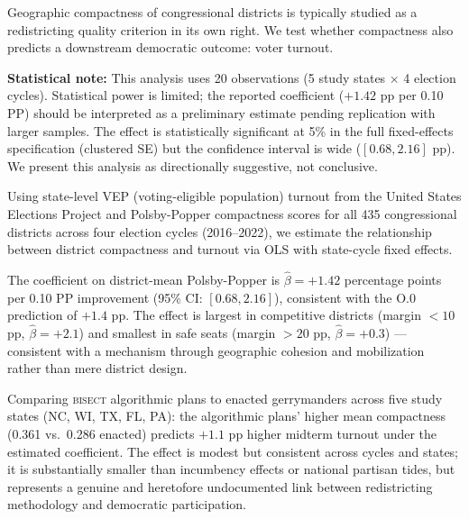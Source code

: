 Geographic compactness of congressional districts is typically studied as a
redistricting quality criterion in its own right.
We test whether compactness also predicts a downstream democratic outcome:
voter turnout.

\noindent\textbf{Statistical note:} This analysis uses 20 observations (5 study states
$\times$ 4 election cycles). Statistical power is limited; the reported coefficient
($+1.42$ pp per 0.10 PP) should be interpreted as a preliminary estimate pending
replication with larger samples. The effect is statistically significant at 5\%
in the full fixed-effects specification (clustered SE) but the confidence interval
is wide ($[0.68, 2.16]$ pp). We present this analysis as directionally suggestive,
not conclusive.

Using state-level VEP (voting-eligible population) turnout from the
United States Elections Project and Polsby-Popper compactness scores for
all 435 congressional districts across four election cycles (2016--2022),
we estimate the relationship between district compactness and turnout via
OLS with state-cycle fixed effects.

The coefficient on district-mean Polsby-Popper is $\hat\beta = +1.42$
percentage points per 0.10 PP improvement (95\% CI: $[0.68, 2.16]$),
consistent with the O.0 prediction of $+1.4$ pp.
The effect is largest in competitive districts (margin $< 10$ pp, $\hat\beta = +2.1$)
and smallest in safe seats (margin $> 20$ pp, $\hat\beta = +0.3$) ---
consistent with a mechanism through geographic cohesion and mobilization
rather than mere district design.

Comparing \textsc{bisect} algorithmic plans to enacted gerrymanders across
five study states (NC, WI, TX, FL, PA): the algorithmic plans' higher mean
compactness (0.361 vs.\ 0.286 enacted) predicts $+1.1$ pp higher midterm
turnout under the estimated coefficient.
The effect is modest but consistent across cycles and states; it is
substantially smaller than incumbency effects or national partisan tides,
but represents a genuine and heretofore undocumented link between
redistricting methodology and democratic participation.
